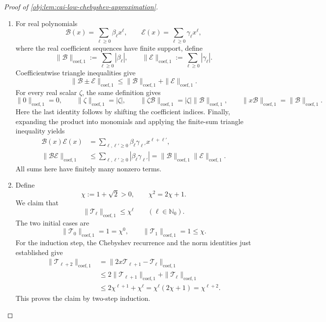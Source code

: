 \begin{proof}[Proof of \cref{obj:lem:cai-low-chebyshev-approximation}]
\begin{enumerate}
\item For real polynomials
\[
\mathcal B(x)=\sum_{\ell\ge0}\beta_\ell x^\ell,
\qquad
\mathcal E(x)=\sum_{\ell\ge0}\gamma_\ell x^\ell,
\]
where the real coefficient sequences have finite support, define
\[
\|\mathcal B\|_{\mathrm{coef},1}
:=\sum_{\ell\ge0}|\beta_\ell|,
\qquad
\|\mathcal E\|_{\mathrm{coef},1}
:=\sum_{\ell\ge0}|\gamma_\ell|.
\]
Coefficientwise triangle inequalities give
\[
\|\mathcal B\pm\mathcal E\|_{\mathrm{coef},1}
\le
\|\mathcal B\|_{\mathrm{coef},1}
+\|\mathcal E\|_{\mathrm{coef},1}.
\]
For every real scalar \(\zeta\), the same definition gives
\[
\|0\|_{\mathrm{coef},1}=0,\qquad
\|\zeta\|_{\mathrm{coef},1}=|\zeta|,\qquad
\|\zeta\mathcal B\|_{\mathrm{coef},1}
=|\zeta|\|\mathcal B\|_{\mathrm{coef},1},\qquad
\|x\mathcal B\|_{\mathrm{coef},1}
=\|\mathcal B\|_{\mathrm{coef},1}.
\]
Here the last identity follows by shifting the coefficient indices. Finally, expanding the product into monomials and applying the finite-sum triangle inequality yields
\[
\begin{aligned}
\mathcal B(x)\mathcal E(x)
&=\sum_{\ell,\ell'\ge0}
 \beta_\ell\gamma_{\ell'}x^{\ell+\ell'},\\
\|\mathcal B\mathcal E\|_{\mathrm{coef},1}
&\le\sum_{\ell,\ell'\ge0}
 |\beta_\ell\gamma_{\ell'}|
=\|\mathcal B\|_{\mathrm{coef},1}
 \|\mathcal E\|_{\mathrm{coef},1}.
\end{aligned}
\]
All sums here have finitely many nonzero terms.

\item Define
\[
\chi:=1+\sqrt2>0,\qquad \chi^2=2\chi+1.
\]
We claim that
\[
\|\mathcal T_\ell\|_{\mathrm{coef},1}\le\chi^\ell
\qquad(\ell\in\mathbb N_0).
\]
The two initial cases are
\[
\|\mathcal T_0\|_{\mathrm{coef},1}=1=\chi^0,
\qquad
\|\mathcal T_1\|_{\mathrm{coef},1}=1\le\chi.
\]
For the induction step, the Chebyshev recurrence and the norm identities just established give
\[
\begin{aligned}
\|\mathcal T_{\ell+2}\|_{\mathrm{coef},1}
&=\|2x\mathcal T_{\ell+1}-\mathcal T_\ell\|_{\mathrm{coef},1}\\
&\le2\|\mathcal T_{\ell+1}\|_{\mathrm{coef},1}
 +\|\mathcal T_\ell\|_{\mathrm{coef},1}\\
&\le2\chi^{\ell+1}+\chi^\ell
=\chi^\ell(2\chi+1)
=\chi^{\ell+2}.
\end{aligned}
\]
This proves the claim by two-step induction.


\end{enumerate}
\end{proof}
